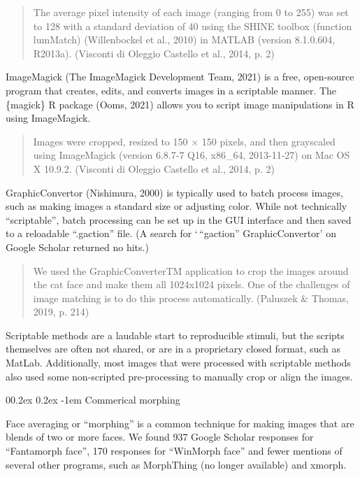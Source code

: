 \documentclass[
  doc,floatsintext]{apa6}
\makeatletter
\let\oldparagraph\paragraph
\renewcommand{\paragraph}[1]{\oldparagraph{#1}\mbox{}}
\renewcommand{\paragraph}{\@startsection{paragraph}{4}{\parindent}%
  {0\baselineskip \@plus 0.2ex \@minus 0.2ex}%
  {-1em}%
  {\normalfont\normalsize\bfseries\itshape\typesectitle}}
\makeatother
\begin{document}
\begin{quote}
The average pixel intensity of each image (ranging from 0 to 255) was set to 128 with a standard deviation of 40 using the SHINE toolbox (function lumMatch) (Willenbockel et al., 2010) in MATLAB (version 8.1.0.604, R2013a). (Visconti di Oleggio Castello et al., 2014, p. 2)
\end{quote}

ImageMagick (The ImageMagick Development Team, 2021) is a free, open-source program that creates, edits, and converts images in a scriptable manner. The \{magick\} R package (Ooms, 2021) allows you to script image manipulations in R using ImageMagick.

\begin{quote}
Images were cropped, resized to 150 × 150 pixels, and then grayscaled using ImageMagick (version 6.8.7-7 Q16, x86\_64, 2013-11-27) on Mac OS X 10.9.2. (Visconti di Oleggio Castello et al., 2014, p. 2)
\end{quote}

GraphicConvertor (Nishimura, 2000) is typically used to batch process images, such as making images a standard size or adjusting color. While not technically ``scriptable'', batch processing can be set up in the GUI interface and then saved to a reloadable ``.gaction'' file. (A search for `\,``gaction'' GraphicConvertor' on Google Scholar returned no hits.)

\begin{quote}
We used the GraphicConverterTM application to crop the images around the cat face and make them all 1024x1024 pixels. One of the challenges of image matching is to do this process automatically. (Paluszek \& Thomas, 2019, p. 214)
\end{quote}

Scriptable methods are a laudable start to reproducible stimuli, but the scripts themselves are often not shared, or are in a proprietary closed format, such as MatLab. Additionally, most images that were processed with scriptable methods also used some non-scripted pre-processing to manually crop or align the images.

\hypertarget{commerical-morphing}{%
\paragraph{Commerical morphing}\label{commerical-morphing}}

Face averaging or ``morphing'' is a common technique for making images that are blends of two or more faces. We found 937 Google Scholar responses for ``Fantamorph face'', 170 responses for ``WinMorph face'' and fewer mentions of several other programs, such as MorphThing (no longer available) and xmorph.
\end{document}

